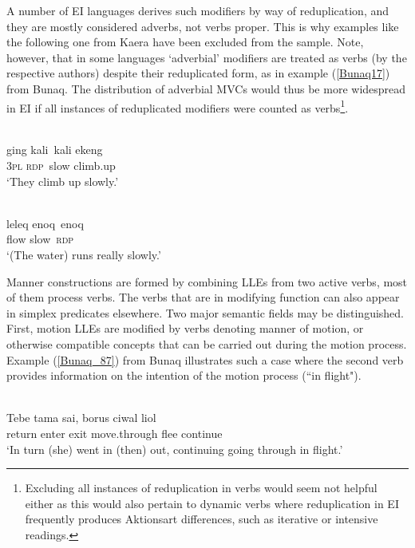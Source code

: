 A number of EI languages derives such modifiers by way of reduplication, and they are mostly considered adverbs, not verbs proper. This is why examples like the following one from Kaera have been excluded from the sample. Note, however, that in some languages `adverbial' modifiers are treated as verbs (by the respective authors) despite their reduplicated form, as in example (\ref{Bunaq17}) from Bunaq. The distribution of adverbial MVCs would thus be more widespread in EI if all instances of reduplicated modifiers were counted as verbs\footnote{Excluding all instances of reduplication in verbs would seem not helpful either as this would also pertain to dynamic verbs where reduplication in EI frequently produces Aktionsart differences, such as iterative or intensive readings.}.

\ea 
{}\\
\gll ging kali~kali ekeng \\
3\textsc{pl} \textsc{rdp}~slow climb.up \\
\glft `They climb up slowly.'\\ 
\z

\ea \label{Bunaq17}
\\
\gll leleq enoq~enoq \\
flow slow~\textsc{rdp} \\
\glft `(The water) runs really slowly.'\\ 
\z

Manner constructions are formed by combining LLEs from two active verbs, most of them process verbs. The verbs that are in modifying function can also appear in simplex predicates elsewhere. Two major semantic fields may be distinguished. First, motion LLEs are modified by verbs denoting manner of motion, or otherwise compatible concepts that can be carried out during the motion process. Example (\ref{Bunaq_87}) from Bunaq illustrates such a case where the second verb provides information on the intention of the motion process (``in flight"). 

\ea \label{Bunaq_87}
\\
\gll Tebe tama sai, borus ciwal liol \\
return enter exit move.through flee continue \\
\glft `In turn (she) went in (then) out, continuing going through in flight.’\\ 
\z

